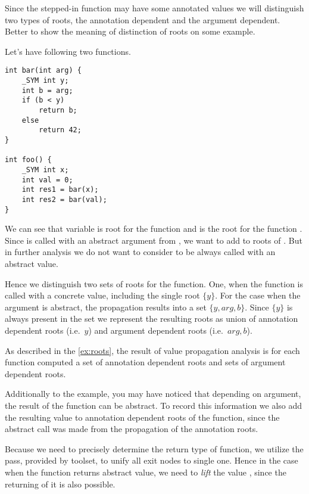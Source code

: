 Since the stepped-in function may have some annotated values we will distinguish
two types of roots, the annotation dependent and the argument dependent. Better
to show the meaning of distinction of roots on some example.

\begin{example} \label{ex:roots} Let's have following two functions.

\begin{verbatim}
int bar(int arg) {
    _SYM int y;
    int b = arg;
    if (b < y)
        return b;
    else
        return 42;
}

int foo() {
    _SYM int x;
    int val = 0;
    int res1 = bar(x);
    int res2 = bar(val);
}
\end{verbatim}
    We can see that variable  is root for the function  and
     is the root for the function . Since  is called
    with an abstract argument from , we want to add  to
    roots of . But in further analysis we do not want to consider
     to be always called with an abstract value.

    Hence we distinguish two sets of roots for the  function. One, when
    the function is called with a concrete value, including the single root
    $\{y\}$. For the case when the argument is abstract, the propagation
    results into a set $\{y, arg, b\}$. Since $\{y\}$ is always present in the
    set we represent the resulting roots as union of annotation dependent roots
    (i.e.~$y$) and argument dependent roots (i.e.~$arg, b$).
\end{example}

As described in the \autoref{ex:roots}, the result of value propagation analysis
is for each function computed a set of annotation dependent roots and sets of
argument dependent roots.

Additionally to the example, you may have noticed that depending on
argument, the result of the  function can be abstract. To record this
information we also add the resulting value  to annotation dependent
roots of the  function, since the abstract call was made from the
propagation of the annotation roots.

Because we need to precisely determine the return type of function, we utilize
the  pass, provided by \LLVM toolset, to unify all
exit nodes to single one. Hence in the case
when the  function returns abstract value, we need to \emph{lift} the
value , since the returning of it is also possible.


